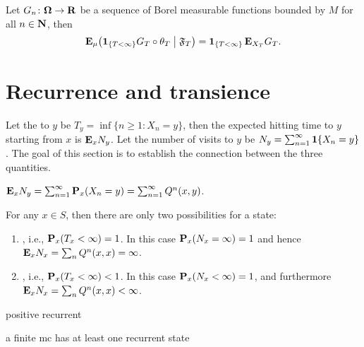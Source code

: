 \documentclass[10pt]{book}
\begin{document}
\begin{namedthm}
    Let $G_n\colon \mathbf \Omega \to \mathbf{R}$ be a sequence of Borel measurable functions bounded by $M$ for all $n \in \mathbf{N}$, then 
    \[
        \mathop{}\!\mathbf{E}_\mu\bigl(\mathbf{1}_{\{T<\infty\}}G_T \circ \theta_T \bigm\vert \mathfrak F_T\bigr) = \mathbf{1}_{\{T<\infty\}}\mathop{}\!\mathbf{E}_{X_T}G_T.
    \]
\end{namedthm}

\section{Recurrence and transience}
Let the  to $y$ be $T_y = \inf\{n\geq 1 : X_n = y\}$, then the expected hitting time to $y$ starting from $x$ is $\mathop{}\!\mathbf{E}_x N_y$. Let the number of visits to $y$ be $N_y = \sum_{n = 1}^\infty \mathbf{1}\{X_n = y\}$. The goal of this section is to establish the connection between the three quantities.

\begin{fact}
    $\mathop{}\!\mathbf{E}_x N_y = \sum_{n=1}^\infty \mathbf{P}_x(X_n = y) = \sum_{n=1}^\infty Q^n(x,y)$.
\end{fact}

\begin{thm}
    For any $x \in S$, then there are only two possibilities for a state: \begin{enumerate}
    \item {}, i.e., $\mathbf{P}_x(T_x<\infty) = 1$. In this case $\mathbf{P}_x(N_x = \infty) = 1$ and hence $\mathop{}\!\mathbf{E}_x N_x = \sum_n Q^n(x,x) = \infty$.
    \item {}, i.e., $\mathbf{P}_x(T_x<\infty) < 1$. In this case $\mathbf{P}_x(N_x < \infty) =1$, and furthermore $\mathop{}\!\mathbf{E}_x N_x = \sum_n Q^n(x,x) < \infty$.
\end{enumerate}
\end{thm}

positive recurrent

a finite mc has at least one recurrent state

\begin{namedthm}
    
\end{namedthm}
\end{document}
